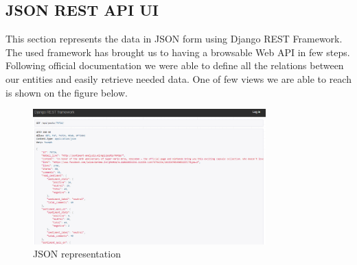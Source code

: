 \newpage

\subsection{JSON REST API UI}\label{sec:rest-app}

This section represents the data in JSON form using Django REST Framework. The used framework has brought us to having a browsable Web API in few steps. Following official documentation we were able to define all the relations between our entities and easily retrieve needed data. One of few views we are able to reach is shown on the figure below.

\begin{figure}[ht]
	\centering
	\includegraphics[width=0.8\textwidth]{04-framework/03-user-interface/images/django_api.png}
	\caption[JSON representation]{JSON representation \label{fig:django-api}}
\end{figure}